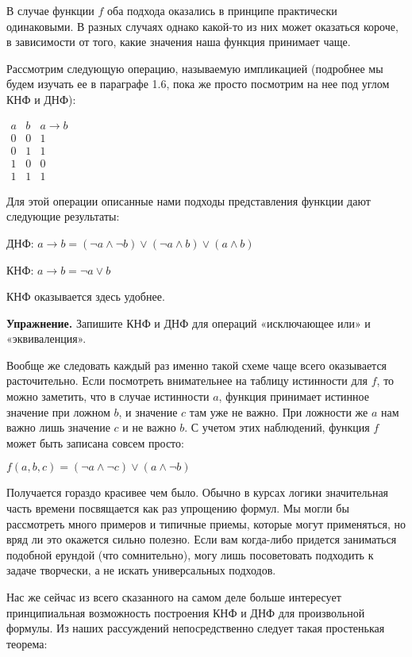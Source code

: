 В случае функции $f$ оба подхода оказались в принципе практически одинаковыми. В разных случаях однако какой-то из них может оказаться короче, в зависимости от того, какие значения наша функция принимает чаще.

Рассмотрим следующую операцию, называемую импликацией (подробнее мы будем изучать ее в параграфе 1.6, пока же просто посмотрим на нее под углом КНФ и ДНФ):

$\begin{array}{cc|c}a&b&a\rightarrow b\\ \hline 0&0&1 \\ 0&1&1 \\ 1&0&0 \\ 1&1&1\end{array}$

Для этой операции описанные нами подходы представления функции дают следующие результаты:

ДНФ: $a \rightarrow b = (\neg a\wedge \neg b)\vee(\neg a \wedge b)\vee(a\wedge b)$

КНФ: $a\rightarrow b = \neg a \vee b$

КНФ оказывается здесь удобнее.

{\bfseries Упражнение.} Запишите КНФ и ДНФ для операций «исключающее или» и «эквиваленция».

Вообще же следовать каждый раз именно такой схеме чаще всего оказывается расточительно. Если посмотреть внимательнее на таблицу истинности для $f$, то можно заметить, что в случае истинности $a$, функция принимает истинное значение при ложном $b$, и значение $c$ там уже не важно. При ложности же $a$ нам важно лишь значение $c$ и не важно $b$. С учетом этих наблюдений, функция $f$ может быть записана совсем просто:

$f(a, b, c) = (\neg a\wedge \neg c) \vee (a \wedge \neg b)$

Получается гораздо красивее чем было. Обычно в курсах логики значительная часть времени посвящается как раз упрощению формул. Мы могли бы рассмотреть много примеров и типичные приемы, которые могут применяться, но вряд ли это окажется сильно полезно. Если вам когда-либо придется заниматься подобной ерундой (что сомнительно), могу лишь посоветовать подходить к задаче творчески, а не искать универсальных подходов.

Нас же сейчас из всего сказанного на самом деле больше интересует принципиальная возможность построения КНФ и ДНФ для произвольной формулы. Из наших рассуждений непосредственно следует такая простенькая теорема:

